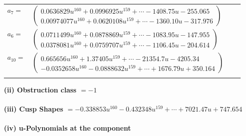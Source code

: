 \documentclass[1p]{elsarticle_modified}
\theoremstyle{definition}
\begin{document}
\begin{tabular}{m{7pt} m{180pt} m{7pt} m{180pt} }
\flushright $a_{7}=$&$\begin{pmatrix}0.0636829 u^{160}+0.0996925 u^{159}+\cdots-1408.75 u-255.065\\0.00974077 u^{160}+0.0620108 u^{159}+\cdots-1360.10 u-317.976\end{pmatrix}$ \\
\flushright $a_{6}=$&$\begin{pmatrix}0.0711499 u^{160}+0.0878869 u^{159}+\cdots-1083.95 u-147.955\\0.0378081 u^{160}+0.0759707 u^{159}+\cdots-1106.45 u-204.614\end{pmatrix}$ \\
\flushright $a_{10}=$&$\begin{pmatrix}0.665656 u^{160}+1.37405 u^{159}+\cdots-21354.7 u-4205.34\\-0.0352658 u^{160}-0.0888632 u^{159}+\cdots+1676.79 u+350.164\end{pmatrix}$\\&\end{tabular}
\flushleft \textbf{(ii) Obstruction class $= -1$}\\~\\
\flushleft \textbf{(iii) Cusp Shapes $= -0.338853 u^{160}-0.432348 u^{159}+\cdots+7021.47 u+747.654$}\\~\\
\newpage\renewcommand{\arraystretch}{1}
\flushleft \textbf{(iv) u-Polynomials at the component}\newline \\
\end{document}
